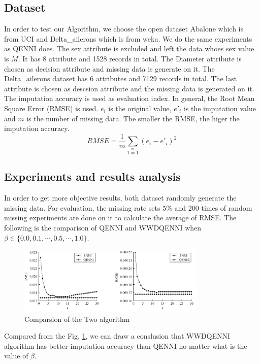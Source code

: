 \documentclass[print]{jicspack}
\begin{document}
\subsection{Dataset}
\label{sec:1.1}
In order to test our Algorithm, we choose the open dataset Abalone which is from UCI and Delta\_ailerons which is from weka. We do the same experiments as QENNI does. The sex attribute is excluded and left the data whoes sex value is $M$. It has 8 attribute and 1528 records in total. The Diameter attribute is chosen as decision attribute and missing data is generate on it. The Delta\_ailerons dataset has 6 attributes and 7129 records in total. The last attribute is chosen as descsion attribute and the missing data is generated on it. The imputation accuracy is used as evaluation index. In general, the Root Mean Square Error (RMSE) is used. $e_i$ is the original value, $e'_i$ is the imputation value and $m$ is the number of missing data. The smaller the RMSE, the higer the imputation accuracy.
\begin{equation}
\label{eq:6}
RMSE = \frac{1}{m}\sum\limits_{1=1}\limits^{m}(e_i - e'_i)^2
\end{equation}

\subsection{Experiments and results analysis}
In order to get more objective results, both dataset randomly generate the missing data. For evaluation, the missing rate sets $5\%$ and 200 times of random missing experiments are done on it to calculate the average of RMSE. The following is the comparison of QENNI and WWDQENNI when $\beta \in \{0.0, 0.1,\cdots,  0.5,\cdots, 1.0\}$.

\begin{figure}[h]
\centering
\includegraphics[angle=0, width=0.8\textwidth]{figure4.png}
\caption{Comparsion of the Two algorithm}
\label{fig:figure4}
\end{figure}
Compared from the Fig. \ref{fig:figure4}, we can draw a conslusion that WWDQENNI algorithm has better imputation accuracy than QENNI no matter what is the value of $\beta$.
\end{document}
